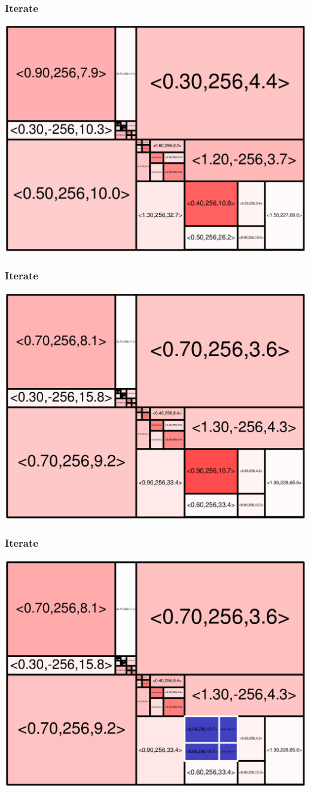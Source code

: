 \begin{frame}
\frametitle{Iterate}\begin{centering}\includegraphics[width=8.5 cm]{remy-graph/graph/test39.pdf}

\end{centering}\end{frame}


\begin{frame}
\frametitle{Iterate}\begin{centering}\includegraphics[width=8.5 cm]{remy-graph/graph/test40.pdf}

\end{centering}\end{frame}


\begin{frame}
\frametitle{Iterate}\begin{centering}\includegraphics[width=8.5 cm]{remy-graph/graph/test41.pdf}

\end{centering}\end{frame}


